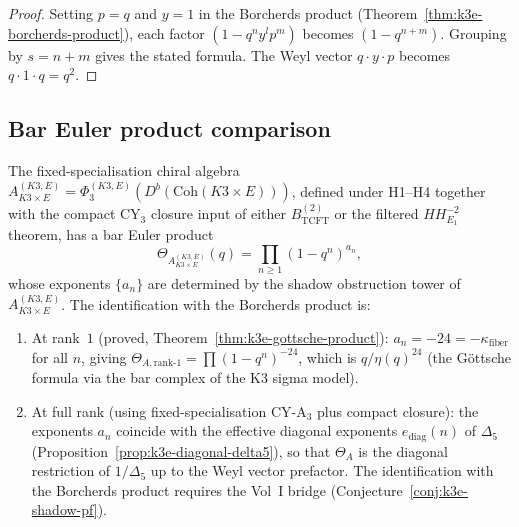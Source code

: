 \begin{proof}
Setting $p = q$ and $y = 1$ in the Borcherds product (Theorem~\ref{thm:k3e-borcherds-product}), each factor $(1 - q^n y^l p^m)$ becomes $(1 - q^{n+m})$. Grouping by $s = n + m$ gives the stated formula. The Weyl vector $q \cdot y \cdot p$ becomes $q \cdot 1 \cdot q = q^2$.
\end{proof}

\subsection{Bar Euler product comparison}
\label{subsec:k3e-bar-euler-comparison}

\begin{conjecture}
\label{conj:k3e-shadow-pf}
The fixed-specialisation chiral algebra
$A^{(K3,E)}_{K3 \times E} = \Phi_3^{(K3,E)}(D^b(\mathrm{Coh}(K3 \times E)))$,
defined under H1--H4 together with the compact CY$_3$ closure input
of either $B_{\mathrm{TCFT}}^{(2)}$ or the filtered $HH^{-2}_{E_1}$
theorem, has a bar Euler product
\[
 \Theta_{A^{(K3,E)}_{K3 \times E}}(q) = \prod_{n \geq 1} (1 - q^n)^{a_n},
\]
whose exponents $\{a_n\}$ are determined by the shadow obstruction tower of $A^{(K3,E)}_{K3 \times E}$. The identification with the Borcherds product is:
\begin{enumerate}[label=(\roman*)]
\item At rank~$1$ \textup{(proved, Theorem~\ref{thm:k3e-gottsche-product}):} $a_n = -24 = -\kappa_{\mathrm{fiber}}$ for all $n$, giving $\Theta_{A,\mathrm{rank\text{-}1}} = \prod(1-q^n)^{-24}$, which is $q/\eta(q)^{24}$ (the G\"ottsche formula via the bar complex of the K3 sigma model).
\item At full rank \textup{(using fixed-specialisation CY-A$_3$ plus compact closure):} the exponents $a_n$ coincide with the effective diagonal exponents $e_{\mathrm{diag}}(n)$ of $\Delta_5$ (Proposition~\ref{prop:k3e-diagonal-delta5}), so that $\Theta_A$ is the diagonal restriction of $1/\Delta_5$ up to the Weyl vector prefactor. The identification with the Borcherds product requires the Vol~I bridge (Conjecture~\ref{conj:k3e-shadow-pf}).
\end{enumerate}
\end{conjecture}

